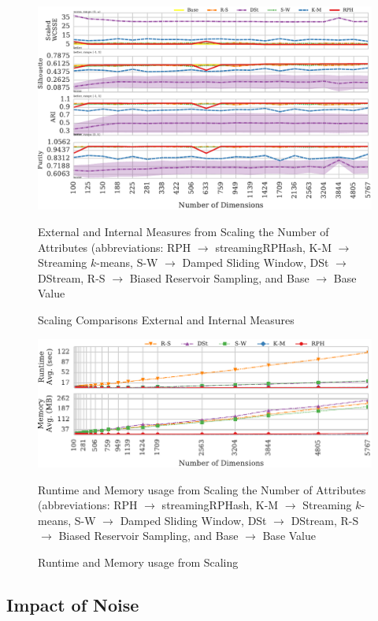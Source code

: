 \begin{figure}
  \centerline{\includegraphics[width=1.1\textwidth]{figs/measure_scale}}
 \caption{Scaling Comparisons External and Internal Measures}{External and Internal Measures from Scaling the Number of Attributes (abbreviations: 
    RPH $\rightarrow$ \textsf{streamingRPHash},
    K-M $\rightarrow$ Streaming $k$-means,
    S-W $\rightarrow$ Damped Sliding Window,
    DSt $\rightarrow$ DStream,
    R-S $\rightarrow$ Biased Reservoir Sampling, and
    Base $\rightarrow$ Base Value}\label{scalability-measures}
\end{figure}

\begin{figure}
  \centerline{\includegraphics[width=.9\textwidth]{figs/runtimeGraphs}}
  \caption{Runtime and Memory usage from Scaling}{Runtime and Memory usage from Scaling the Number of Attributes (abbreviations:
    RPH $\rightarrow$ \textsf{streamingRPHash},
    K-M $\rightarrow$ Streaming $k$-means,
    S-W $\rightarrow$ Damped Sliding Window,
    DSt $\rightarrow$ DStream,
    R-S $\rightarrow$ Biased Reservoir Sampling, and
    Base $\rightarrow$ Base Value}\label{scalability-perf}
\end{figure}

\subsection{Impact of Noise}\label{noise}


